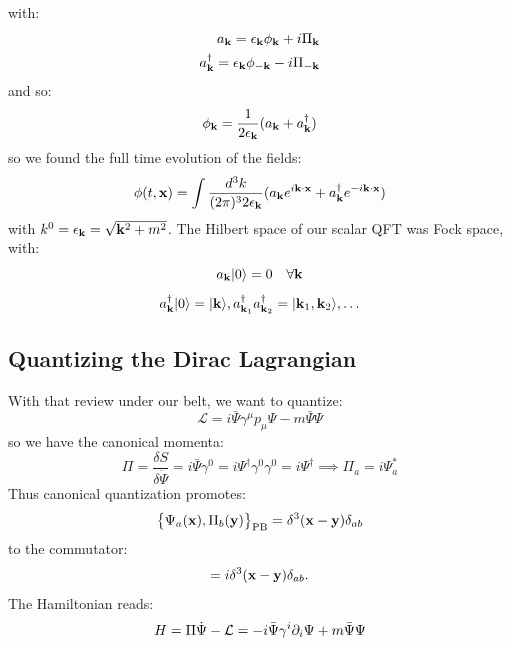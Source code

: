 with:
\begin{equation}
    \begin{split}
        a_{\mathbf{k}} = \epsilon_{\mathbf{k}}\phi_{\mathbf{k}} + i\Pi_{\mathbf{k}}
        \\ a_{\mathbf{k}}^\dagger = \epsilon_{\mathbf{k}}\phi_{-\mathbf{k}} - i\Pi_{-\mathbf{k}}
    \end{split}
\end{equation}
and so:
\begin{equation}
    \phi_{\mathbf{k}} = \frac{1}{2\epsilon_{\mathbf{k}}}(a_{\mathbf{k}} + a_{\mathbf{k}}^\dagger)
\end{equation}
so we found the full time evolution of the fields:
\begin{equation}
    \phi(t, \mathbf{x}) = \int \frac{d^3k}{(2\pi)^32\epsilon_{\mathbf{k}}}(a_{\mathbf{k}}e^{i\mathbf{k} \cdot \mathbf{x}} + a^\dagger_{\mathbf{k}}e^{-i\mathbf{k} \cdot \mathbf{x}})
\end{equation}
with $k^0 = \epsilon_{\mathbf{k}} = \sqrt{\mathbf{k}^2 + m^2}$. The Hilbert space of our scalar QFT was Fock space, with:
\begin{equation}
    a_{\mathbf{k}}\lvert 0 \rangle = 0 \quad \forall \mathbf{k}
\end{equation}
\begin{equation}
    a^\dagger_{\mathbf{k}}\lvert 0 \rangle = \lvert \mathbf{k} \rangle, a^\dagger_{\mathbf{k}_1}a^\dagger_{\mathbf{k}_2} = \lvert \mathbf{k}_1, \mathbf{k}_2 \rangle, \ldots
\end{equation}

\subsection{Quantizing the Dirac Lagrangian}
With that review under our belt, we want to quantize:
\begin{equation}
    \mathcal{L} = i\bar{\Psi}\gamma^\mu p_\mu \Psi - m\bar{\Psi}\Psi
\end{equation}
so we have the canonical momenta:
\begin{equation}
    \Pi = \frac{\delta S}{\delta \dot{\Psi}} = i\bar{\Psi}\gamma^0 = i\Psi^\dag \gamma^0 \gamma^0 = i\Psi^\dag \implies \Pi_a = i\Psi_a^*
\end{equation}
Thus canonical quantization promotes:
\begin{equation}
    \set{\Psi_a(\ensuremath{\mathbf{x}}), \Pi_b(\ensuremath{\mathbf{y}})}_{\text{PB}} = \delta^3(\mathbf{x} - \mathbf{y})\delta_{ab}
\end{equation}
to the commutator:
\begin{equation}
    [\hat{\Psi}_a(\v{x}), \hat{\Pi}_b(\v{y})] = i\delta^3(\v{x} - \v{y})\delta_{ab}.
\end{equation}
The Hamiltonian reads:
\begin{equation}
    H = \Pi\dot{\Psi} - \mathcal{L} = -i\bar{\Psi}\gamma^i\partial_i \Psi + m\bar{\Psi}\Psi
\end{equation}

